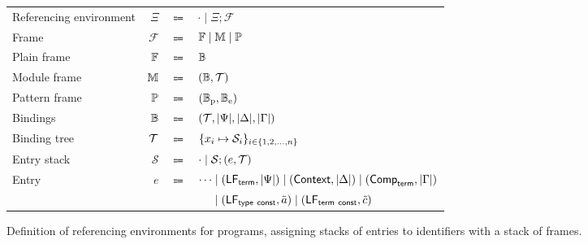 \begin{figure}
\centering
{\footnotesize
\begin{tabular}{lrcl}
Referencing environment & $\Xi$ & $\Coloneqq$ & $ \cdot \mid \Xi; \mathcal{F} $\\
Frame & $ \mathcal{F} $ & $ \Coloneqq $ & $ \mathbb{F} \mid \mathbb{M} \mid \mathbb{P} $\\
Plain frame & $ \mathbb{F} $ & $ \Coloneqq $ & $ \mathbb{B} $\\
Module frame & $ \mathbb{M} $ & $ \Coloneqq $ & $ (\mathbb{B}, \mathcal{T}) $\\
Pattern frame & $ \mathbb{P} $ & $ \Coloneqq $ & $ (\mathbb{B}_{\text{p}}, \mathbb{B}_{\text{e}}) $\\
Bindings & $ \mathbb{B} $ & $ \Coloneqq $ & $ (\mathcal{T}, |\Psi|, |\Delta|, |\Gamma|) $\\
Binding tree & $ \mathcal{T} $ & $ \Coloneqq $ & $ \{x_i \mapsto \mathcal{S}_i\}_{i \in \{1, 2, \dots, n\}} $\\
Entry stack & $ \mathcal{S} $ & $ \Coloneqq $ & $ \cdot \mid \mathcal{S}; (e, \mathcal{T}) $\\
Entry & $ e $ & $ \Coloneqq $ & $ \cdots \mid (\mathsf{LF}_{\mathsf{term}}, |\Psi|) \mid (\mathsf{Context}, |\Delta|) \mid (\mathsf{Comp}_{\mathsf{term}}, |\Gamma|) $\\
&&& $ \phantom{\cdots} \mid (\mathsf{LF}_{\mathsf{type\ const}}, \tilde a) \mid (\mathsf{LF}_{\mathsf{term\ const}}, \tilde c) $
\end{tabular}
}
\caption[Definition of referencing environments for \Beluga programs]{%
Definition of referencing environments for \Beluga programs, assigning stacks of entries to identifiers with a stack of frames.
}
\label{figure:referencing-environment-definition}
\end{figure}

